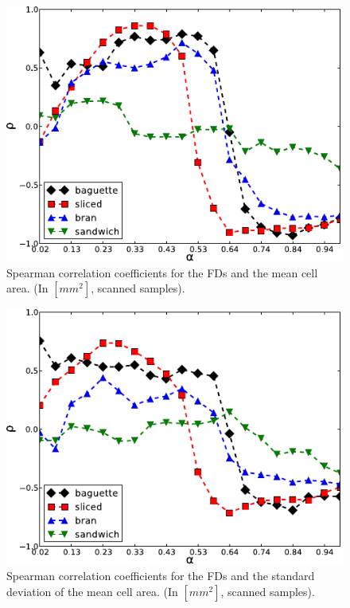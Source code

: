 \documentclass[spanish,a4paper,11pt,oneside,links]{report}
\begin{document}
\begin{figure}[h!]
\centering
\includegraphics{MCA}
\caption{Spearman correlation coefficients for the FDs and the mean cell area. (In $[mm^{2}]$, scanned samples).}
\label{fig:corrMCA}
\end{figure}

\begin{figure}[h!]
\centering
\includegraphics{stMCA}
\caption{Spearman correlation coefficients for the FDs and the standard deviation of the mean cell area. (In $[mm^{2}]$, scanned samples).}
\label{fig:corrMCAstdev}
\end{figure}
\end{document}
